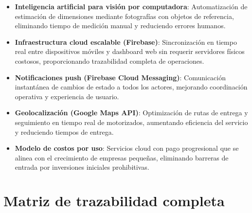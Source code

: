 \begin{itemize}
    \item \textbf{Inteligencia artificial para visión por computadora}: Automatización de estimación de dimensiones mediante fotografías con objetos de referencia, eliminando tiempo de medición manual y reduciendo errores humanos.
    
    \item \textbf{Infraestructura cloud escalable (Firebase)}: Sincronización en tiempo real entre dispositivos móviles y dashboard web sin requerir servidores físicos costosos, proporcionando trazabilidad completa de operaciones.
    
    \item \textbf{Notificaciones push (Firebase Cloud Messaging)}: Comunicación instantánea de cambios de estado a todos los actores, mejorando coordinación operativa y experiencia de usuario.
    
    \item \textbf{Geolocalización (Google Maps API)}: Optimización de rutas de entrega y seguimiento en tiempo real de motorizados, aumentando eficiencia del servicio y reduciendo tiempos de entrega.
    
    \item \textbf{Modelo de costos por uso}: Servicios cloud con pago progresional que se alinea con el crecimiento de empresas pequeñas, eliminando barreras de entrada por inversiones iniciales prohibitivas.
\end{itemize}

\chapter{Matriz de trazabilidad completa}
\label{anexo:trazabilidad}

